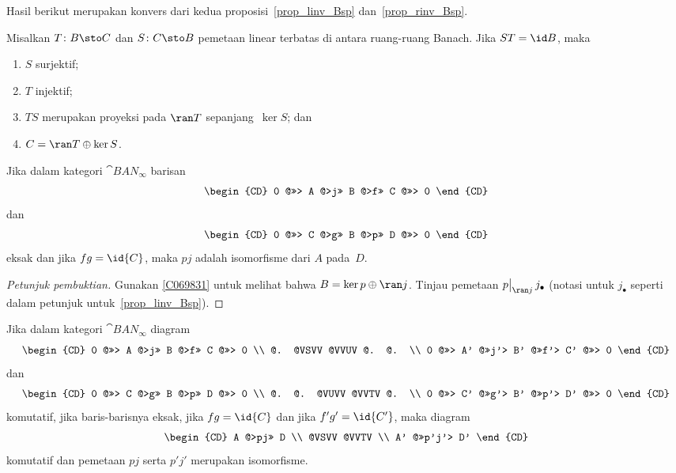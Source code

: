 Hasil berikut merupakan konvers dari kedua proposisi~\ref{prop_linv_Bsp} dan~\ref{prop_rinv_Bsp}.

\begin{prop}\label{C069831} Misalkan $T \colon B \sto C$ dan $S\colon C \sto B$ pemetaan linear terbatas di antara ruang-ruang
Banach. Jika $ST = \id B$, maka
 \begin{enumerate}[label=\rm{(\alph*)}]
  \item[(a)] $S$ surjektif;
  \item[(b)] $T$ injektif;
  \item[(c)] $TS$ merupakan proyeksi pada $\ran T$ sepanjang~$\ker S$; dan
  \item[(d)] $C = \ran T \oplus \ker S$.
 \end{enumerate}
\end{prop}

\begin{prop} Jika dalam kategori $\cat{BAN_\infty}$ barisan
 \[ \begin{CD} 0 @>>> A @>j>> B @>f>> C @>>> 0
    \end{CD}\]
 dan
 \[ \begin{CD} 0 @>>> C @>g>> B @>p>> D @>>> 0
    \end{CD}\]
eksak dan jika $fg = \id{C}$, maka $pj$ adalah isomorfisme dari $A$ pada~$D$.
\end{prop}

\begin{proof}[\emph{Petunjuk pembuktian}] Gunakan \ref{C069831} untuk melihat bahwa $B = \ker p \oplus \ran j$. Tinjau pemetaan
$\bigl.p\bigr|_{\ran j}\,j_\bullet$ (notasi untuk $j_\bullet$ seperti dalam petunjuk untuk~\ref{prop_linv_Bsp}). \ns
\end{proof}

\begin{prop}\label{prop_merge_exactCD} Jika dalam kategori $\cat{BAN_\infty}$ diagram
 \begin{equation} \begin{CD} 0 @>>> A @>j>> B @>f>> C @>>> 0  \\
      @.   @VSVV   @VVUV   @.    @.    \\
 0 @>>> A' @>>j'> B' @>>f'> C' @>>> 0
    \end{CD}\end{equation}
dan
 \[ \begin{CD} 0 @>>> C @>g>> B @>p>> D @>>> 0   \\
      @.     @.   @VUVV   @VVTV     @.  \\
  0 @>>> C' @>>g'> B' @>>p'> D' @>>> 0
    \end{CD}\]
komutatif, jika baris-barisnya eksak, jika $fg = \id{C}$ dan jika $f'g' = \id{C'}$, maka diagram
 \[ \begin{CD}  A  @>pj>>  D   \\
       @VSVV   @VVTV  \\
     A'  @>>p'j'> D'
    \end{CD}\]
komutatif dan pemetaan $pj$ serta $p'j'$ merupakan isomorfisme.
\end{prop}

